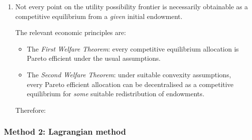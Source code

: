 \documentclass[12pt]{article}
\begin{document}
\begin{enumerate}[label=(\alph*)]
    \item
    Not every point on the utility possibility frontier is necessarily obtainable as a competitive equilibrium from a \emph{given} initial endowment.

    The relevant economic principles are:
    \begin{itemize}[leftmargin=*]
        \item The \emph{First Welfare Theorem}: every competitive equilibrium allocation is Pareto efficient under the usual assumptions.
        \item The \emph{Second Welfare Theorem}: under suitable convexity assumptions, every Pareto efficient allocation can be decentralised as a competitive equilibrium for \emph{some} suitable redistribution of endowments.
    \end{itemize}

    Therefore:
    \begin{center}
    \end{center}
\end{enumerate}

\newpage
\subsubsection{Method 2: Lagrangian method}
\end{document}
